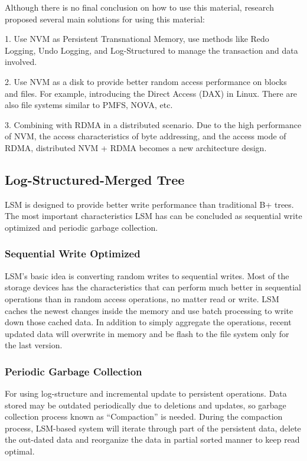 Although there is no final conclusion on how to use this material, research proposed several main solutions for using this material: 

1. Use NVM as Persistent Transnational Memory, use methods like Redo Logging, Undo Logging, and Log-Structured to manage the transaction and data involved. 

2. Use NVM as a disk to provide better random access performance on blocks and files. For example, introducing the Direct Access (DAX) in Linux. There are also file systems\cite{dulloor2014system} similar to PMFS, NOVA\cite{xu2016nova}, etc.

3. Combining with RDMA in a distributed scenario. Due to the high performance of NVM, the access characteristics of byte addressing, and the access mode of RDMA, distributed NVM + RDMA becomes a new architecture design.


\subsection{Log-Structured-Merged Tree}\label{LSM-introduction}
LSM is designed to provide better write performance than traditional B+ trees. The most important characteristics LSM has can be concluded as sequential write optimized and periodic garbage collection.

\subsubsection{Sequential Write Optimized} 

LSM's basic idea is converting random writes to sequential writes. Most of the storage devices has the characteristics that can perform much better in sequential operations than in random access operations, no matter read or write. LSM caches the newest changes inside the memory and use batch processing to write down those cached data. In addition to simply aggregate the operations, recent updated data will overwrite in
memory and be flash to the file system only for the last version.

\subsubsection{Periodic Garbage Collection} 

For using log-structure and incremental update to persistent operations. Data stored may be outdated periodically due to deletions and updates, so garbage collection process known as ``Compaction'' is needed. During the compaction process, LSM-based system will iterate through part of the persistent data, delete the out-dated data and reorganize the data in partial sorted manner to keep read optimal.

